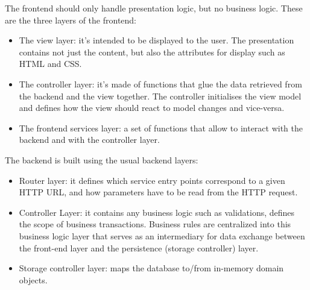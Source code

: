 \begin{legal}
\begin{legal}
				The frontend should only handle presentation logic, but no business logic. These are the three layers of the frontend:
				\begin{itemize}
					\item The view layer: it's intended to be displayed to the user. The presentation contains not just the content, but also the attributes for display such as HTML and CSS.
					\item The controller layer: it's made of functions that glue the data retrieved from the backend and the view together. The controller initialises the view model and defines how the view should react to model changes and vice-versa.
					\item The frontend services layer: a set of functions that allow to interact with the backend and with the controller layer.
				\end{itemize}
				The backend is built using the usual backend layers:
				\begin{itemize}
    				\item Router layer: it defines which service entry points correspond to a given HTTP URL, and how parameters have to be read from the HTTP request.
					\item Controller Layer: it contains any business logic such as validations, defines the scope of business transactions. Business rules are centralized into this business logic layer that serves as an intermediary for data exchange between the front-end layer and the persistence (storage controller) layer.
    				\item Storage controller layer: maps the database to/from in-memory domain objects.
				\end{itemize}
				\begin{figure}

\end{figure}
\end{legal}
\end{legal}
